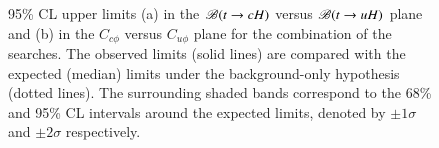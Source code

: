 \begin{figure}[t!]
\begin{center}
\caption{\small {95\% CL upper limits (a) in the $\mathscr{B}(t\rightarrow cH)$ versus $\mathscr{B}(t\rightarrow uH)$ plane and (b) in the 
$C_{c\phi}$ versus $C_{u\phi}$ plane for the combination of the searches. The observed limits (solid lines) are compared with the expected (median) limits under the background-only hypothesis (dotted lines). The surrounding shaded bands correspond to the 68\% and 95\% CL intervals around the expected limits, 
denoted by $\pm 1\sigma$ and $\pm 2\sigma$ respectively.}}
\label{fig:limits_combo_2D} 
\end{center}
\end{figure}





